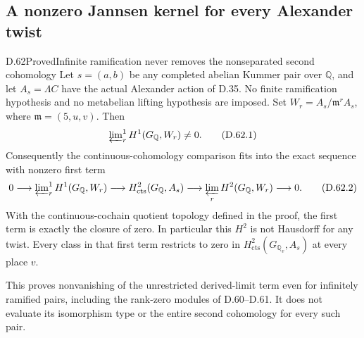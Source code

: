 \subsection{A nonzero Jannsen kernel for every Alexander twist}

\begin{statement}{D.62}{Proved}{Infinite ramification never removes the nonseparated second cohomology}
Let \(s=(a,b)\) be any completed abelian Kummer pair over
\(\mathbb Q\), and let \(A_s=\Lambda C\) have the actual
Alexander action of D.35. No finite ramification hypothesis
and no metabelian lifting hypothesis are imposed. Set
\(W_r=A_s/\mathfrak m^r A_s\), where
\(\mathfrak m=(5,u,v)\). Then
\[
 \varprojlim\nolimits_r^1 H^1(G_{\mathbb Q},W_r)\ne0.
                                                        \tag{D.62.1}
\]
Consequently the continuous-cohomology comparison fits into
the exact sequence with nonzero first term
\[
 0\longrightarrow
 \varprojlim\nolimits_r^1 H^1(G_{\mathbb Q},W_r)
 \longrightarrow H^2_{\mathrm{cts}}(G_{\mathbb Q},A_s)
 \longrightarrow\varprojlim_r H^2(G_{\mathbb Q},W_r)
 \longrightarrow0.
                                                        \tag{D.62.2}
\]
With the continuous-cochain quotient topology defined in
the proof, the first term is exactly the closure of zero.
In particular this \(H^2\) is not Hausdorff for any twist.
Every class in that first term restricts to zero in
\(H^2_{\mathrm{cts}}(G_{\mathbb Q_v},A_s)\) at every place
\(v\).

This proves nonvanishing of the unrestricted derived-limit
term even for infinitely ramified pairs, including the
rank-zero modules of D.60--D.61. It does not evaluate its
isomorphism type or the entire second cohomology for every
such pair.
\end{statement}


